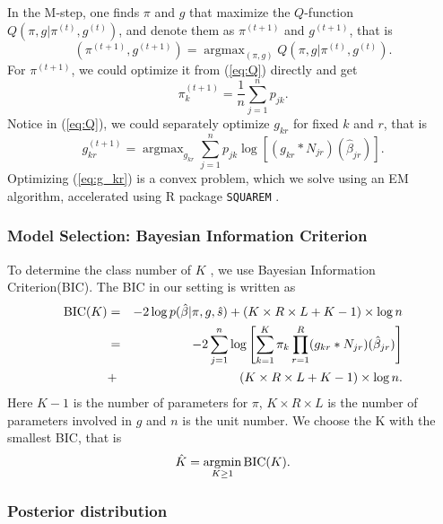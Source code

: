 \documentclass[11pt]{article}
\DeclareMathOperator*{\argmax}{argmax}
\DeclareMathOperator*{\argmin}{argmin}
\begin{document}
In the M-step, one finds $\pi$ and $g$ that maximize the $Q$-function $Q(\pi,g|\pi^{(t)},g^{(t)})$, and denote them as $\pi^{(t+1)}$ and $g^{(t+1)}$, that is 
\begin{equation}
(\pi^{(t+1)}, g^ {(t+1)}) =\argmax_{(\pi,g)} Q(\pi,g|\pi^{(t)},g^{(t)}).
\end{equation}
For $\pi^{(t+1)}$, we could optimize it from (\ref{eq:Q}) directly and get
\begin{equation}
    \pi_k^{(t+1)} = \frac{1}{n} \sum_{j=1}^n p_{jk}.
\end{equation}
Notice in (\ref{eq:Q}), we could separately optimize $g_{kr}$ for fixed $k$ and $r$, that is 
\begin{equation}
    g_{kr}^ {(t+1)}=\argmax_{g_{kr}}\sum_{j=1}^np_{jk}\log \left[(g_{kr}*N_{jr})(\hat\beta_{jr}) \right].
\label{eq:g_kr}
\end{equation}
Optimizing (\ref{eq:g_kr}) is a convex problem, which we solve using an EM algorithm, accelerated using R package {\tt SQUAREM} .

\subsubsection{Model Selection: Bayesian Information Criterion}

To determine the class number of $K$ , we use Bayesian Information Criterion(BIC). The BIC in our setting is written as 
\begin{eqnarray}
{\rm BIC}(K) &=& -2\log p(\hat\beta|\pi,g,\hat s) + (K\times R\times L+K-1)\times \log n \nonumber \\
&=& -2 \sum_{j=1}^n\log\left[\sum_{k=1}^K\pi_k\prod_{r=1}^R(g_{kr}*N_{jr})(\hat\beta_{jr})\right] \nonumber\\
&+& (K\times R\times L+K-1)\times \log n.
\end{eqnarray}
Here $K-1$ is the number of parameters for $\pi$, $K\times R\times L$ is the number of parameters involved in $g$ and $n$ is the unit number. We choose the K with the smallest BIC, that is 
\begin{equation}
\hat K = \argmin_{K\geq1} {\rm BIC}(K).
\end{equation}

\subsubsection{Posterior distribution}
\end{document}

